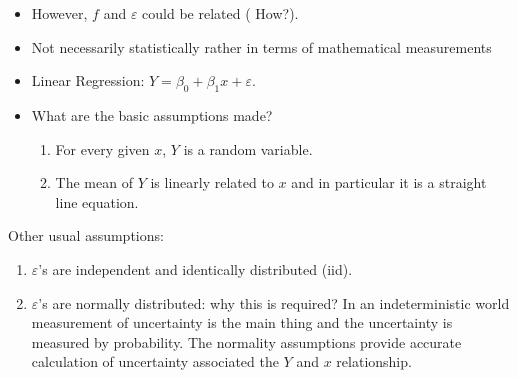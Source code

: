 \documentclass[12pt]{beamer}
\begin{document}
\begin{frame}
  \begin{itemize}
 \item<1-> However, $f$ and $\varepsilon$ could be related (\alert{
 How?}).

 \item<2->Not necessarily statistically rather in terms of
 mathematical measurements

 \item<3-> Linear Regression:
    $Y=\beta_{0}+\beta_{1}x+\varepsilon$.
    \item<4-> What are the basic assumptions made?

    \begin{enumerate}
      \item<1-> For every given $x$, $Y$ is a random variable.
      \item<2-> The mean of $Y$ is linearly related to $x$ and in
      particular it is a straight line equation.
  \end{enumerate}
   \end{itemize}
\end{frame}

\begin{frame}

      Other usual assumptions:
      \begin{enumerate}
      \item<1-> $\varepsilon$'s are independent and identically
      distributed (iid).
      \item<2-> $\varepsilon$'s are normally distributed: why this
      is required? In an indeterministic world measurement
      of uncertainty is the main thing and the uncertainty
      is measured by probability. The normality assumptions
      provide accurate calculation of uncertainty associated
      the $Y$ and $x$ relationship.
    \end{enumerate}
\end{frame}
\end{document}
